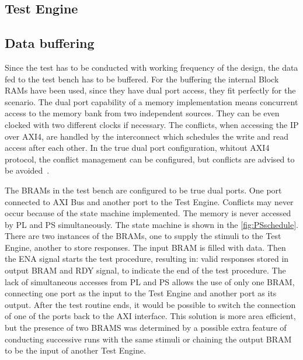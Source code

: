 \subsection{Test Engine}\label{ssec:engine}


\subsection{Data buffering}
Since the test has to be conducted with working frequency of the design, the data fed to the test bench has to be buffered. For the buffering the internal Block RAMs have been used, since they have dual port access, they fit perfectly for the scenario. The dual port capability of a memory implementation means concurrent access to the memory bank from two independent sources. They can be even clocked with two different clocks if necessary. The conflicts, when accessing the IP over AXI4, are handled by the interconnect which schedules the write and read access after each other. In the true dual port configuration, whitout AXI4 protocol, the conflict management can be configured, but conflicts are advised to be avoided~\cite{report:BRAM}.

The BRAMs in the test bench are configured to be true dual ports. One port connected to AXI Bus and another port to the Test Engine. Conflicts may never occur because of the state machine implemented. The memory is never accessed by PL and PS simultaneously. The state machine is shown in the \autoref{fig:PSschedule}. There are two instances of the BRAMs, one to supply the stimuli to the Test Engine, another to store responses. The input BRAM is filled with data. Then the ENA signal starts the test procedure, resulting in: valid responses stored in output BRAM and RDY signal, to indicate the end of the test procedure. The lack of simultaneous accesses from PL and PS allows the use of only one BRAM, connecting one port as the input to the Test Engine and another port as its output. After the test routine ends, it would be possible to switch the connection of one of the ports back to the AXI interface. This solution is more area efficient, but the presence of two BRAMS was determined by a possible extra feature of conducting successive runs with the same stimuli or chaining the output BRAM to be the input of another Test Engine. 

